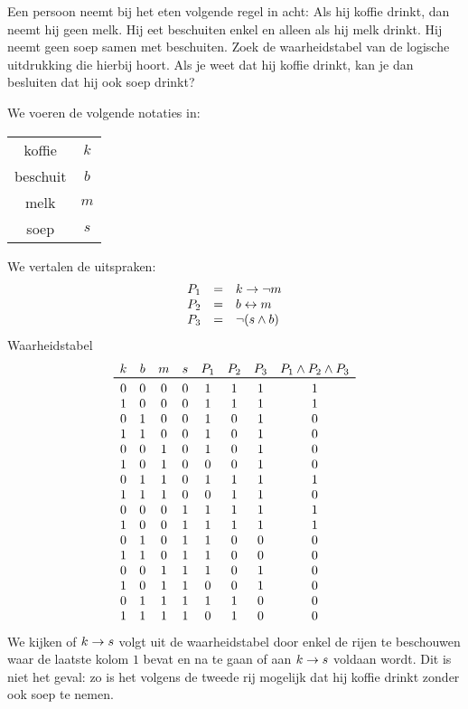 \begin{oef}
Een persoon neemt bij het eten volgende regel in acht:
Als hij koffie drinkt, dan neemt hij geen melk.
Hij eet beschuiten enkel en alleen als hij melk drinkt.
Hij neemt geen soep samen met beschuiten.
Zoek de waarheidstabel van de logische uitdrukking die hierbij hoort. 
Als je weet dat hij koffie drinkt, kan je dan besluiten dat hij ook soep drinkt?
\begin{opl}
We voeren de volgende notaties in:
\begin{center}
  \begin{tabular}{cc}
    koffie   & $k$ \\
    beschuit & $b$ \\
    melk     & $m$ \\
    soep     & $s$
  \end{tabular}
\end{center}
We vertalen de uitspraken:
\[
  \begin{array}{rcl}
    P_1 & = & k \rightarrow \neg m \\
    P_2 & = & b \leftrightarrow m \\
    P_3 & = & \neg (s \wedge b)
  \end{array}
\]
Waarheidstabel
\[
  \begin{array}{cccccccc}
    k & b & m & s & P_1 & P_2 & P_3 & P_1 \en P_2 \en P_3 \\
    \toprule
    0 & 0 & 0 & 0 & 1 & 1 & 1 & 1 \\
    1 & 0 & 0 & 0 & 1 & 1 & 1 & 1 \\
    0 & 1 & 0 & 0 & 1 & 0 & 1 & 0 \\
    1 & 1 & 0 & 0 & 1 & 0 & 1 & 0 \\
    0 & 0 & 1 & 0 & 1 & 0 & 1 & 0 \\
    1 & 0 & 1 & 0 & 0 & 0 & 1 & 0 \\
    0 & 1 & 1 & 0 & 1 & 1 & 1 & 1 \\
    1 & 1 & 1 & 0 & 0 & 1 & 1 & 0 \\
    0 & 0 & 0 & 1 & 1 & 1 & 1 & 1 \\
    1 & 0 & 0 & 1 & 1 & 1 & 1 & 1 \\
    0 & 1 & 0 & 1 & 1 & 0 & 0 & 0 \\
    1 & 1 & 0 & 1 & 1 & 0 & 0 & 0 \\
    0 & 0 & 1 & 1 & 1 & 0 & 1 & 0 \\
    1 & 0 & 1 & 1 & 0 & 0 & 1 & 0 \\
    0 & 1 & 1 & 1 & 1 & 1 & 0 & 0 \\
    1 & 1 & 1 & 1 & 0 & 1 & 0 & 0 \\
  \end{array}
\]
We kijken of $k \rightarrow s$ volgt uit de waarheidstabel door enkel de rijen
te beschouwen waar de laatste kolom $1$ bevat en na te gaan of aan $k \rightarrow s$ voldaan wordt.
Dit is niet het geval: zo is het volgens de tweede rij mogelijk dat hij koffie drinkt zonder ook
soep te nemen.
\end{opl}
\end{oef}

